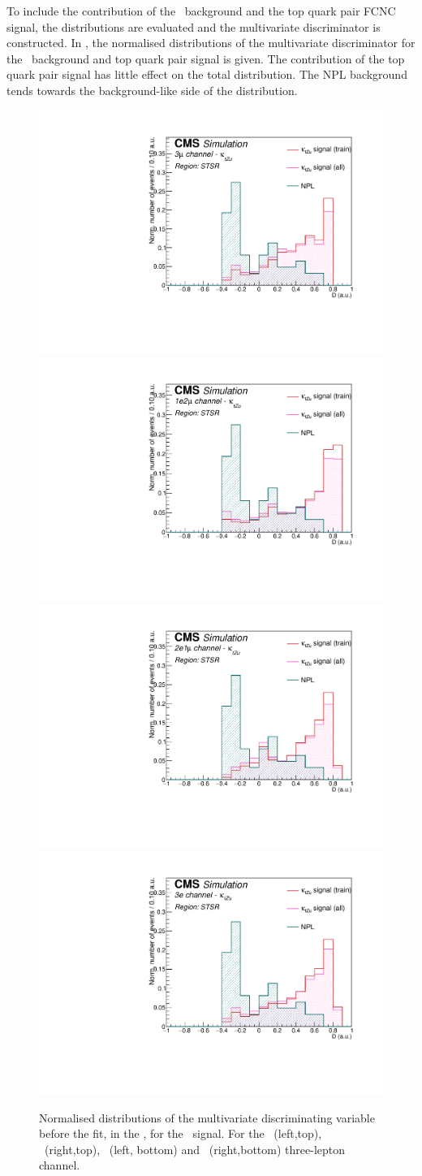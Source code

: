 To include the contribution of the \NPL\ background and the top quark pair FCNC signal, the distributions are evaluated and the multivariate discriminator is constructed. In , the normalised distributions of the multivariate discriminator for the \NPL\ background and top quark pair signal is given. The contribution of the top quark pair signal has little effect on the total distribution. The NPL background tends towards the background-like side of the distribution. 
\begin{figure}[htbp]
	\centering
	\includegraphics[width=0.49\linewidth]{6_Search/Figures/PlotsTechnicsRead/BDTtechnicsallZutsingletopuuu}
	\includegraphics[width=0.49\linewidth]{6_Search/Figures/PlotsTechnicsRead/BDTtechnicsallZutsingletopuue}
	\includegraphics[width=0.49\linewidth]{6_Search/Figures/PlotsTechnicsRead/BDTtechnicsallZutsingletopeeu}
	\includegraphics[width=0.49\linewidth]{6_Search/Figures/PlotsTechnicsRead/BDTtechnicsallZutsingletopeee}
	\caption{Normalised distributions of the multivariate discriminating variable before the fit, in the \STSR, for the \Zut\ signal. For the \mumumu\ (left,top), \emumu\ (right,top), \eemu\ (left, bottom) and \eee\ (right,bottom) three-lepton channel.}
	\label{fig:bdtSTSRZut}
\end{figure}	

